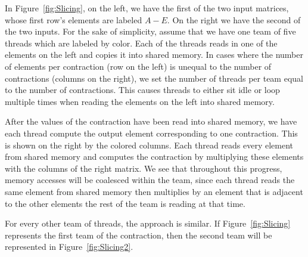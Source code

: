     In Figure~\ref{fig:Slicing}, on the left, we have the first of the two input matrices, whose first row's
elements are labeled $A-E$. On the right we have the second of the two inputs.
For the sake of simplicity, assume that we have one team of five threads which
are labeled by color. Each of the threads reads in one of the elements on the
left and copies it into shared memory. In cases where the number of elements
per contraction (row on the left) is unequal to the number of contractions
(columns on the right), we set the number of threads per team equal to the
number of contractions. This causes threads to either sit idle or loop multiple
times when reading the elements on the left into shared memory.
	
    After the values of the contraction have been read into shared memory, we
have each thread compute the output element corresponding to one contraction.
This is shown on the right by the colored columns. Each thread reads every
element from shared memory and computes the contraction by multiplying these
elements with the columns of the right matrix. We see that throughout this
progress, memory accesses will be coalesced within the team, since each thread
reads the same element from shared memory then multiplies by an element that is
adjacent to the other elements the rest of the team is reading at that time. 
	
    For every other team of threads, the approach is similar. If Figure~\ref{fig:Slicing}
represents the first team of the contraction, then the second team will be
represented in Figure~\ref{fig:Slicing2}. 

